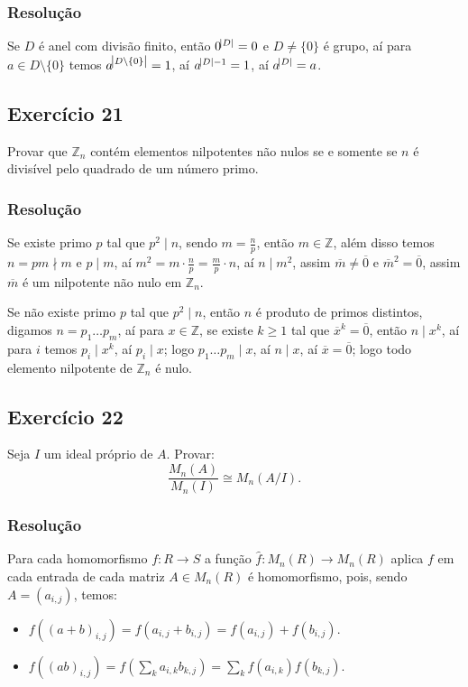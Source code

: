 \documentclass[10pt,a4paper]{article}
\begin{document}
\subsubsection*{Resolução}

Se $D$ é anel com divisão finito, então $0^{\abs{D}}=0$ e $D\neq\{0\}$ é grupo, aí para $a\in D\setminus\{0\}$ temos $a^{\abs{D\setminus\{0\}}}=1$, aí $a^{\abs{D}-1}=1$, aí $a^{\abs{D}}=a$.

\subsection*{Exercício 21}
Provar que $\mathbb{Z}_n$ contém elementos nilpotentes não nulos se e somente se $n$ é divisível pelo quadrado de um número primo.

\subsubsection*{Resolução}

Se existe primo $p$ tal que $p^2\mid n$, sendo $m=\frac{n}{p}$, então $m\in\mathbb{Z}$, além disso temos $n=pm\nmid m$ e $p\mid m$, aí $m^2=m\cdot\frac{n}{p}=\frac{m}{p}\cdot n$, aí $n\mid m^2$, assim $\overline{m}\neq\overline{0}$ e $\overline{m}^2=\overline{0}$, assim $\overline{m}$ é um nilpotente não nulo em $\mathbb{Z}_n$.

\medskip
\noindent
Se não existe primo $p$ tal que $p^2\mid n$, então $n$ é produto de primos distintos, digamos $n=p_1\dots p_m$, aí para $x\in\mathbb{Z}$, se existe $k\geq 1$ tal que $\overline{x}^k=\overline{0}$, então $n\mid x^k$, aí para $i$ temos $p_i\mid x^k$, aí $p_i\mid x$; logo $p_1\dots p_m\mid x$, aí $n\mid x$, aí $\overline{x}=\overline{0}$; logo todo elemento nilpotente de $\mathbb{Z}_n$ é nulo.

\subsection*{Exercício 22}
Seja $I$ um ideal próprio de $A$. Provar:
\[
\frac{M_n(A)}{M_n(I)}\cong M_n(A/I).
\]

\subsubsection*{Resolução}

Para cada homomorfismo $f:R\rightarrow S$ a função $\hat{f}:M_n(R)\rightarrow M_n(R)$ aplica $f$ em cada entrada de cada matriz $A\in M_n(R)$ é homomorfismo, pois, sendo $A=(a_{i,j})$, temos:
\begin{itemize}
\item $f((a+b)_{i,j})=f(a_{i,j}+b_{i,j})=f(a_{i,j})+f(b_{i,j})$.
\item $f((ab)_{i,j})=f(\sum_k a_{i,k}b_{k,j})=\sum_k f(a_{i,k})f(b_{k,j})$.
\end{itemize}
\end{document}
